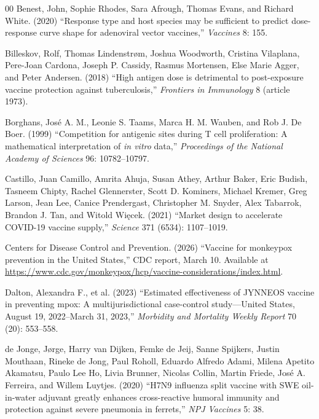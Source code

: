 \documentclass[12pt]{article}
\newcommand{\Wiecek}{Wi\k{e}cek}
\begin{document}
\begin{thebibliography}{00}
Benest, John, Sophie Rhodes, Sara Afrough, Thomas Evans, and Richard
White. (2020) ``Response type and host species may be sufficient to
predict dose-response curve shape for adenoviral vector vaccines,''
{\em Vaccines} 8: 155.

Billeskov, Rolf, Thomas Lindenstr\o{}m, Joshua Woodworth, Cristina
Vilaplana, Pere-Joan Cardona, Joseph P. Cassidy, Rasmus Mortensen,
Else Marie Agger, and Peter Andersen. (2018) ``High antigen dose is
detrimental to post-exposure vaccine protection against
tuberculosis,'' {\em Frontiers in Immunology} 8 (article 1973).

Borghans, Jos\'{e} A. M., Leonie S. Taams, Marca H. M. Wauben, and Rob
J. De Boer. (1999) ``Competition for antigenic sites during T cell
proliferation: A mathematical interpretation of {\em in vitro} data,''
{\em Proceedings of the National Academy of Sciences} 96:
10782--10797.

Castillo, Juan Camillo, Amrita Ahuja, Susan Athey, Arthur Baker, Eric
Budish, Tasneem Chipty, Rachel Glennerster, Scott D. Kominers, Michael
Kremer, Greg Larson, Jean Lee, Canice Prendergast, Christopher
M. Snyder, Alex Tabarrok, Brandon J. Tan, and Witold \Wiecek. (2021)
``Market design to accelerate COVID-19 vaccine supply,'' {\em Science}
371 (6534): 1107--1019.

Centers for Disease Control and Prevention. (2026) ``Vaccine for
monkeypox prevention in the United States,'' CDC report, March
10. Available at
\url{https://www.cdc.gov/monkeypox/hcp/vaccine-considerations/index.html}.

Dalton, Alexandra F., et al. (2023) ``Estimated effectiveness
of JYNNEOS vaccine in preventing mpox: A multijurisdictional
case-control study---United States, August 19, 2022--March 31, 2023,''
{\em Morbidity and Mortality Weekly Report} 70 (20): 553--558.

de Jonge, J{\o}rge, Harry van Dijken, Femke de Jeij, Sanne Spijkers,
Justin Mouthaan, Rineke de Jong, Paul Roholl, Eduardo Alfredo Adami,
Milena Apetito Akamatsu, Paulo Lee Ho, Livia Brunner, Nicolas Collin,
Martin Friede, Jos\'{e} A. Ferreira, and Willem Luytjes. (2020) ``H7N9
influenza split vaccine with SWE oil-in-water adjuvant greatly
enhances cross-reactive humoral immunity and protection against severe
pneumonia in ferrets,'' {\em NPJ Vaccines} 5: 38.


\end{thebibliography}
\end{document}
